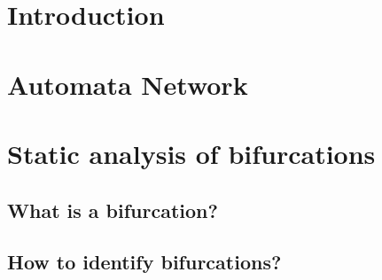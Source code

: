 \documentclass[fleqn,10pt,c]{beamer}
\begin{document}
\newcommand{\citepmrtcsb}{Paulevé, Magnin, Roux in \textit{Transactions on Computational Systems Biology}, 2011}
\newcommand{\citepmrmscs}{Paulevé, Magnin, Roux in \textit{Mathematical Structures in Computer Science}, 2012}
\newcommand{\citefpimrcmsb}{{\small Folschette, Paulevé, Inoue, Magnin, Roux\\in \textit{Computational Methods in Systems Biology}, 2012}}
\newcommand{\citedejong}{De Jong in \textit{Journal of Computational Biology}, 2002}
\newcommand{\citerichardcomet}{Richard, Comet in \textit{Discrete Applied Mathematics}, 2007}
\newcommand{\citeremy}{Remy, Ruet, Thieffry in \textit{Advances in Applied Mathematics}, 2008}
\newcommand{\citesmbionet}{Bernot, Comet, Richard, Guespin in \textit{Journal of Theoretical Biology}, 2004}
\newcommand{\citeito}{Ito, Izumi, Hagihara, Yonezaki in \textit{BioInformatics and BioEngineering}, 2010}
\newcommand{\citeatfb}{Abou-Jaoudé et al, in \textit{Frontiers in Bioengineering and Biotechnology}, 2015}
\newcommand{\citelui}{Liu et al, in \textit{Journal of Bioinformatics and Computational Biology}, 2012}


\section{Introduction}



\section{Automata Network}

%

\section{Static analysis of bifurcations}
\subsection{What is a bifurcation?}




\subsection{How to identify bifurcations?}

%

\end{document}
